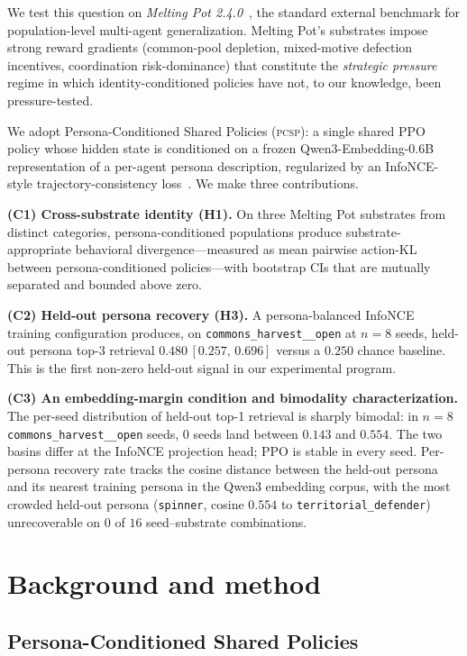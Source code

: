 \documentclass[11pt]{article}
\newcommand{\PCSP}{\textsc{pcsp}\xspace}
\newcommand{\InfoNCE}{InfoNCE\xspace}
\newcommand{\cH}{\texttt{commons\_harvest\_\_open}\xspace}
\begin{document}
We test this question on \textit{Melting Pot 2.4.0}~\cite{leibo2021meltingpot},
the standard external benchmark for population-level multi-agent
generalization. Melting Pot's substrates impose strong reward gradients
(common-pool depletion, mixed-motive defection incentives, coordination
risk-dominance) that constitute the \textit{strategic pressure} regime in which
identity-conditioned policies have not, to our knowledge, been pressure-tested.

We adopt Persona-Conditioned Shared Policies (\PCSP): a single shared
PPO~\cite{schulman2017ppo} policy whose hidden state is conditioned on a frozen
Qwen3-Embedding-0.6B~\cite{qwen3embed} representation of a per-agent persona
description, regularized by an \InfoNCE-style trajectory-consistency
loss~\cite{oord2018cpc}. We make three contributions.

\textbf{(C1) Cross-substrate identity (H1).} On three Melting Pot substrates
from distinct categories, persona-conditioned populations produce substrate-
appropriate behavioral divergence---measured as mean pairwise action-KL between
persona-conditioned policies---with bootstrap CIs that are mutually separated
and bounded above zero.

\textbf{(C2) Held-out persona recovery (H3).} A persona-balanced \InfoNCE
training configuration produces, on \cH at $n=8$ seeds, held-out persona
top-3 retrieval $0.480\,[0.257,\,0.696]$ versus a $0.250$ chance baseline.
This is the first non-zero held-out signal in our experimental program.

\textbf{(C3) An embedding-margin condition and bimodality
characterization.} The per-seed distribution of held-out top-1 retrieval is
sharply bimodal: in $n=8$ \cH seeds, $0$ seeds land between $0.143$ and
$0.554$. The two basins differ at the \InfoNCE projection head; PPO is stable
in every seed. Per-persona recovery rate tracks the cosine distance between
the held-out persona and its nearest training persona in the Qwen3 embedding
corpus, with the most crowded held-out persona (\texttt{spinner}, cosine
$0.554$ to \texttt{territorial\_defender}) unrecoverable on $0$ of
$16$ seed--substrate combinations.

\section{Background and method}
\label{sec:method}

\subsection{Persona-Conditioned Shared Policies}
\label{sec:method:pcsp}
\end{document}
